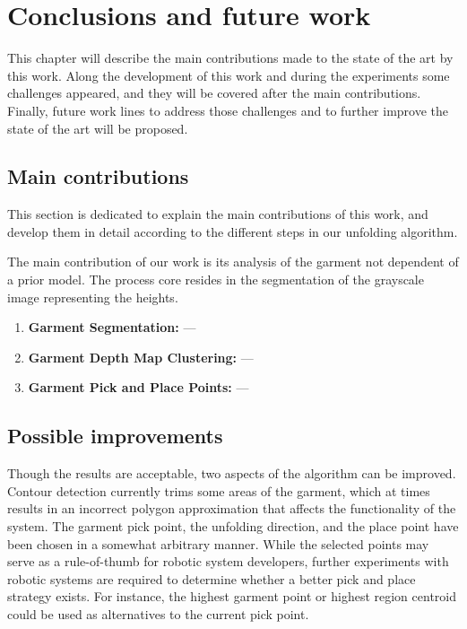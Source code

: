 \chapter{Conclusions and future work}
\label{conclusions_and_future_work}

This chapter will describe the main contributions made to the state of the art by this work. Along the development of this work and during the experiments some challenges appeared, and they will be covered after the main contributions. Finally, future work lines to address those challenges and to  further improve the state of the art will be proposed.


\section {Main contributions}
\label{conclusions:contributions}

This section is dedicated to explain the main contributions of this work, and develop them in detail according to the different steps in our unfolding algorithm.

The main contribution of our work is its analysis of the garment not dependent of a prior model. The process core resides in the segmentation of the grayscale image representing the heights. 

\begin{enumerate}
	\item \textbf{Garment Segmentation:} ---
	\item \textbf{Garment Depth Map Clustering:} ---
	\item \textbf{Garment Pick and Place Points:} ---
\end{enumerate}

\section {Possible improvements}
\label{conclusions:improvements}
Though the results are acceptable, two aspects of the algorithm can be improved.
Contour detection currently trims some areas of the garment, which at times results in an incorrect polygon approximation that affects the functionality of the system.
The garment pick point, the unfolding direction, and the place point have been chosen in a somewhat arbitrary manner. While the selected points may serve as a rule-of-thumb for robotic system developers, further experiments with robotic systems are required to determine whether a better pick and place strategy exists. For instance, the highest garment point or highest region centroid could be used as alternatives to the current pick point.

